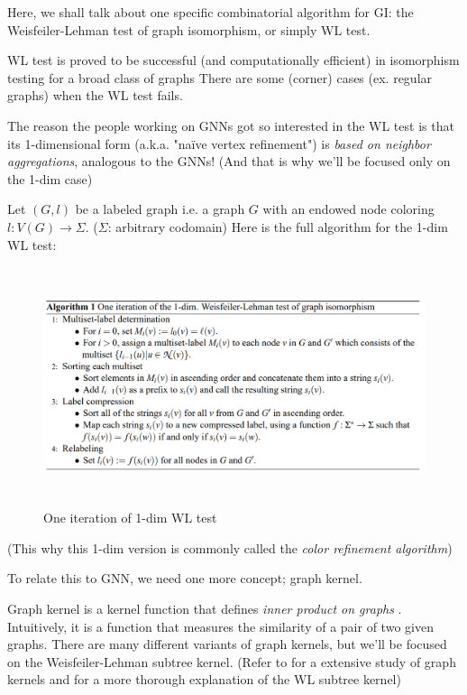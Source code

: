 Here, we shall talk about one specific combinatorial algorithm for \textsc{GI}: the Weisfeiler-Lehman test of graph isomorphism\cite{Weisfeiler1968}, or simply WL test.

WL test is proved to be successful (and computationally efficient) in isomorphism testing for a broad class of graphs\cite{Babai1979} There are some (corner) cases (ex. regular graphs) when the WL test fails\cite{Cai1992}.

The reason the people working on GNNs got so interested in the WL test is that its 1-dimensional form (a.k.a. "na\"ive vertex refinement") is {\it based on neighbor aggregations}, analogous to the GNNs!
(And that is why we'll be focused only on the 1-dim case)

Let $(G, l)$ be a labeled graph i.e. a graph $G$ with an endowed node coloring $l : V(G) \rightarrow \Sigma$.
($\Sigma$: arbitrary codomain)
Here is the full algorithm for the 1-dim WL test\cite{Shervashidze2009}:

\begin{figure}[hbt]
\centering
	\includegraphics[height=7cm]{preliminaries/fig/wl-alg.png}
	\caption{One iteration of 1-dim WL test}
\end{figure}
	(This why this 1-dim version is commonly called the {\it color refinement algorithm})

To relate this to GNN, we need one more concept; graph kernel.

Graph kernel is a kernel function that defines {\it inner product on graphs} \cite{Vishwanathan2010}.
Intuitively, it is a function that measures the similarity of a pair of two given graphs.
There are many different variants of graph kernels, but we'll be focused on the Weisfeiler-Lehman subtree kernel\cite{Shervashidze2009}.
(Refer to \cite{Vishwanathan2010} for a extensive study of graph kernels and \cite{Shervashidze2011} for a more thorough explanation of the WL subtree kernel)

